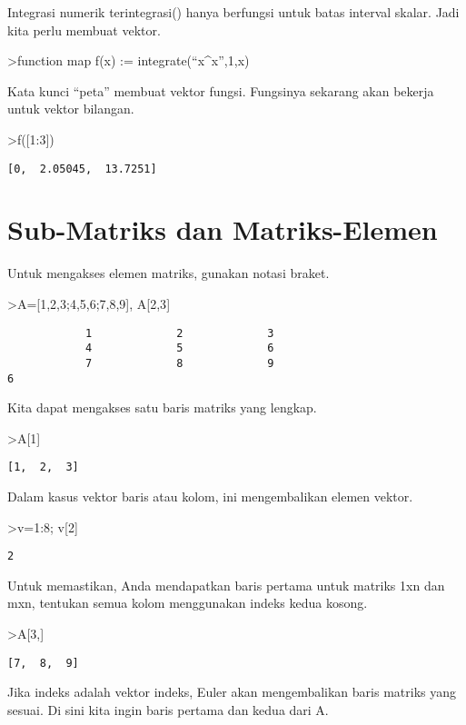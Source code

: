 \documentclass[
]{book}
\begin{document}
Integrasi numerik terintegrasi() hanya berfungsi untuk batas interval skalar. Jadi kita perlu membuat vektor.

\textgreater function map f(x) := integrate(``x\^{}x'',1,x)

Kata kunci ``peta'' membuat vektor fungsi. Fungsinya sekarang akan bekerja untuk vektor bilangan.

\textgreater f({[}1:3{]})

\begin{verbatim}
[0,  2.05045,  13.7251]
\end{verbatim}

\chapter{Sub-Matriks dan Matriks-Elemen}\label{sub-matriks-dan-matriks-elemen}

Untuk mengakses elemen matriks, gunakan notasi braket.

\textgreater A={[}1,2,3;4,5,6;7,8,9{]}, A{[}2,3{]}

\begin{verbatim}
            1             2             3 
            4             5             6 
            7             8             9 
6
\end{verbatim}

Kita dapat mengakses satu baris matriks yang lengkap.

\textgreater A{[}1{]}

\begin{verbatim}
[1,  2,  3]
\end{verbatim}

Dalam kasus vektor baris atau kolom, ini mengembalikan elemen vektor.

\textgreater v=1:8; v{[}2{]}

\begin{verbatim}
2
\end{verbatim}

Untuk memastikan, Anda mendapatkan baris pertama untuk matriks 1xn dan mxn, tentukan semua kolom menggunakan indeks kedua kosong.

\textgreater A{[}3,{]}

\begin{verbatim}
[7,  8,  9]
\end{verbatim}

Jika indeks adalah vektor indeks, Euler akan mengembalikan baris matriks yang sesuai. Di sini kita ingin baris pertama dan kedua dari A.
\end{document}
